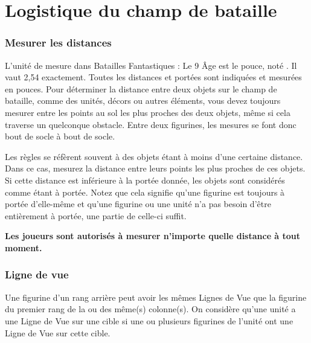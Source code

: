 
\part{Logistique du champ de bataille}

\section{Mesurer les distances}

L'unité de mesure dans Batailles Fantastiques : Le 9\ieme{} Âge est le pouce, noté \distance{}. Il vaut 2,54 {\centi\meter} exactement. Toutes les distances et portées sont indiquées et mesurées en pouces. Pour déterminer la distance entre deux objets sur le champ de bataille, comme des unités, décors ou autres éléments, vous devez toujours mesurer entre les points au sol les plus proches des deux objets, même si cela traverse un quelconque obstacle. Entre deux figurines, les mesures se font donc bout de socle à bout de socle.

Les règles se réfèrent souvent à des objets étant à moins d'une certaine distance. Dans ce cas, mesurez la distance entre leurs points les plus proches de ces objets. Si cette distance est inférieure à la portée donnée, les objets sont considérés comme étant à portée. Notez que cela signifie qu'une figurine est toujours à portée d'elle-même et qu'une figurine ou une unité n'a pas besoin d'être entièrement à portée, une partie de celle-ci suffit.
 
\textbf{Les joueurs sont autorisés à mesurer n'importe quelle distance à tout moment.}

\section{Ligne de vue}

 Une figurine d'un rang arrière peut avoir les mêmes Lignes de Vue que la figurine du premier rang de la ou des même(s) colonne(s). On considère qu'une unité a une Ligne de Vue sur une cible si une ou plusieurs figurines de l'unité ont une Ligne de Vue sur cette cible. 

